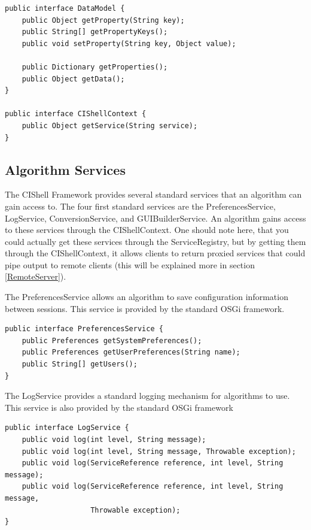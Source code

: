 \documentclass[a4]{article}
\begin{document}

\begin{verbatim}
public interface DataModel {
    public Object getProperty(String key);
    public String[] getPropertyKeys();
    public void setProperty(String key, Object value);
    
    public Dictionary getProperties();
    public Object getData();
}

public interface CIShellContext {
    public Object getService(String service);
}
\end{verbatim}

\subsection{Algorithm Services}
\label{AlgorithmServices}

The CIShell Framework provides several standard services that an algorithm can
gain access to. The four first standard services are the PreferencesService,
LogService, ConversionService, and GUIBuilderService. An algorithm gains access
to these services through the CIShellContext. One should note here, that you
could actually get these services through the ServiceRegistry, but by getting
them through the CIShellContext, it allows clients to return proxied services
that could pipe output to remote clients (this will be explained more in section
\ref{RemoteServer}).

The PreferencesService allows an algorithm to save configuration information
between sessions. This service is provided by the standard OSGi
framework\footnotemark[3].

\begin{verbatim}
public interface PreferencesService {
    public Preferences getSystemPreferences();
    public Preferences getUserPreferences(String name);
    public String[] getUsers();
}
\end{verbatim}

The LogService provides a standard logging mechanism for algorithms to use. This
service is also provided by the standard OSGi framework\footnotemark[4]

\begin{verbatim}
public interface LogService {
    public void log(int level, String message);
    public void log(int level, String message, Throwable exception);
    public void log(ServiceReference reference, int level, String message);
    public void log(ServiceReference reference, int level, String message,
                    Throwable exception);
}
\end{verbatim}
\end{document}
